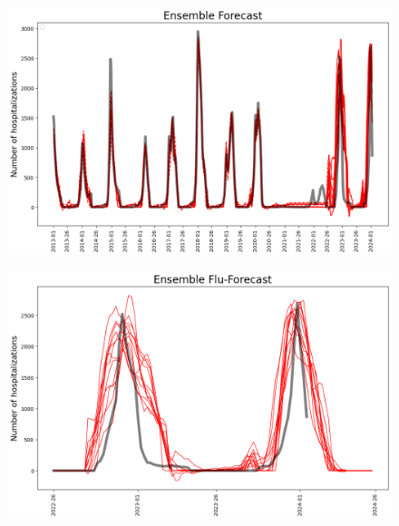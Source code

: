 \documentclass[12pt,a4paper,english]{article}
\begin{document}
\begin{figure}[h!]
		\begin{center}
		\includegraphics[scale=0.6]{Pictures/full_ensemble.png}
		\caption{}
		\end{center}
		\label{fig:full}
	\end{figure}
\FloatBarrier


\begin{figure}[h!]
		\begin{center}
		\includegraphics[scale=0.6]{Pictures/forecast.png}
		\caption{}
		\end{center}
		\label{fig:f}
	\end{figure}
\FloatBarrier
\end{document}
